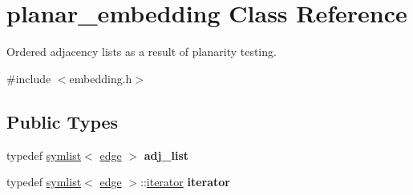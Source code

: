 \hypertarget{classplanar__embedding}{}\section{planar\+\_\+embedding Class Reference}
\label{classplanar__embedding}


Ordered adjacency lists as a result of planarity testing.  




{\ttfamily \#include $<$embedding.\+h$>$}

\subsection*{Public Types}
\begin{DoxyCompactItemize}
\item 
\mbox{\label{classplanar__embedding_a2f2057ce2f9c23616696042457fd52ff}} 
typedef \mbox{\hyperlink{classsymlist}{symlist}}$<$ \mbox{\hyperlink{classedge}{edge}} $>$ {\bfseries adj\+\_\+list}
\item 
\mbox{\label{classplanar__embedding_a2a2da42b192eb461aad874f0a7e1e430}} 
typedef \mbox{\hyperlink{classsymlist}{symlist}}$<$ \mbox{\hyperlink{classedge}{edge}} $>$\+::\mbox{\hyperlink{structsymlist__iterator}{iterator}} {\bfseries iterator}
\end{DoxyCompactItemize}
